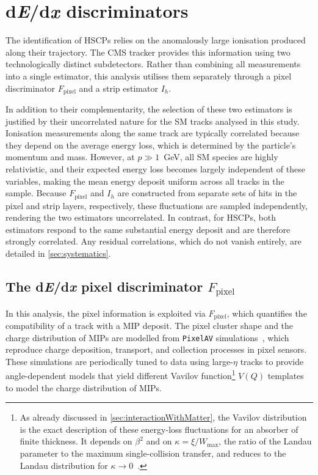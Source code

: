 \section{d\textit{E}/d\textit{x} discriminators}
\label{sec:discriminators}

The identification of HSCPs relies on the anomalously large ionisation produced along their trajectory. The CMS tracker provides this information using two technologically distinct subdetectors. Rather than combining all measurements into a single estimator, this analysis utilises them separately through a pixel discriminator $F_{\text{pixel}}$ and a strip estimator $I_h$.

In addition to their complementarity, the selection of these two estimators is justified by their uncorrelated nature for the SM tracks analysed in this study. Ionisation measurements along the same track are typically correlated because they depend on the average energy loss, which is determined by the particle's momentum and mass. However, at $p\gg 1$~GeV, all SM species are highly relativistic, and their expected energy loss becomes largely independent of these variables, making the mean energy deposit uniform across all tracks in the sample. Because $F_{\text{pixel}}$ and $I_h$ are constructed from separate sets of hits in the pixel and strip layers, respectively, these fluctuations are sampled independently, rendering the two estimators uncorrelated. In contrast, for HSCPs, both estimators respond to the same substantial energy deposit and are therefore strongly correlated. Any residual correlations, which do not vanish entirely, are detailed in \cref{sec:systematics}.


\subsection{The d\textit{E}/d\textit{x} pixel discriminator \texorpdfstring{$F_{\text{pixel}}$}{Fpixel}}

In this analysis, the pixel information is exploited via $F_{\text{pixel}}$, which quantifies the compatibility of a track with a MIP deposit. The pixel cluster shape and the charge distribution of MIPs are modelled from \texttt{PixelAV} simulations~\cite{1495807}, which reproduce charge deposition, transport, and collection processes in pixel sensors. 
These simulations are periodically tuned to data using large-$\eta$ tracks to provide angle-dependent models that yield different Vavilov function\footnote{As already discussed in \cref{sec:interactionWithMatter}, the Vavilov distribution is the exact description of these energy-loss fluctuations for an absorber of finite thickness. It depends on $\beta^2$ and on
$\kappa = \xi/W_{\max}$, the ratio of the Landau parameter to the maximum single-collision transfer, and reduces to the Landau distribution for $\kappa \to 0$~\cite{Vavilov:1957}.} $V(Q)$ templates to model the charge distribution of MIPs.

